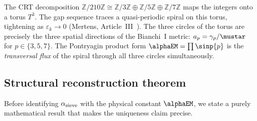\documentclass[12pt,a4paper]{article}
\begin{document}
\begin{remark}
\label{rem:toric_spiral_metric}
The CRT decomposition
$\mathbb{Z}/210\mathbb{Z} \cong \mathbb{Z}/3\mathbb{Z} \oplus
\mathbb{Z}/5\mathbb{Z} \oplus \mathbb{Z}/7\mathbb{Z}$
maps the integers onto a torus $T^3$.  The gap sequence traces a
quasi-periodic spiral on this torus, tightening as
$\varepsilon_k \to 0$ (Mertens, Article~III~\cite{companion_M3}).
The three circles of the torus are precisely the three spatial
directions of the Bianchi~I metric: $a_p = \gamma_p / \mustar$ for
$p \in \{3, 5, 7\}$.  The Pontryagin product form
$\alphaEM = \prod \sinp{p}$ is the \emph{transversal flux} of the
spiral through all three circles simultaneously.
\end{remark}

\subsection{Structural reconstruction theorem}
\label{sec:ch9_reconstruction_thm}

Before identifying $\alpha_{\rm sieve}$ with the physical constant $\alphaEM$,
we state a purely mathematical result that makes the uniqueness claim precise.
\end{document}
